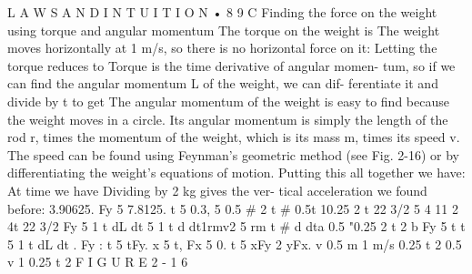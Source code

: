 \documentclass[10pt,oneside]{article}
\begin{document}
L A W S  A N D  I N T U I T I O N • 8 9 C Finding the force on the weight using torque and angular momentum The torque on the weight is The weight moves horizontally at 1 m/s, so there is no horizontal force on it: Letting the torque reduces to Torque is the time derivative of angular momen- tum, so if we can find the angular momentum L of the weight, we can dif- ferentiate it and divide by t to get The angular momentum of the weight is easy to find because the weight moves in a circle. Its angular momentum is simply the length of the rod r, times the momentum of the weight, which is its mass m, times its speed v. The speed can be found using Feynman’s geometric method (see Fig. 2-16) or by differentiating the weight’s equations of motion. Putting this all together we have: At time we have Dividing by 2 kg gives the ver- tical acceleration we found before: 3.90625. Fy 5 7.8125. t 5 0.3, 5 0.5 \# 2 t \# 0.5t 10.25 2 t 22 3/2 5 4 11 2 4t 22 3/2 Fy 5 1 t  dL dt 5 1 t  d dt1rmv2 5 rm t \# d dta 0.5 "0.25 2 t 2 b Fy 5 t t 5 1 t  dL dt . Fy : t 5 tFy. x 5 t, Fx 5 0. t 5 xFy 2 yFx. v 0.5 m 1 m/s 0.25   t 2 0.5 v 1 0.25   t 2 F I G U R E  2 - 1 6\par

\clearpage
{}
\end{document}
